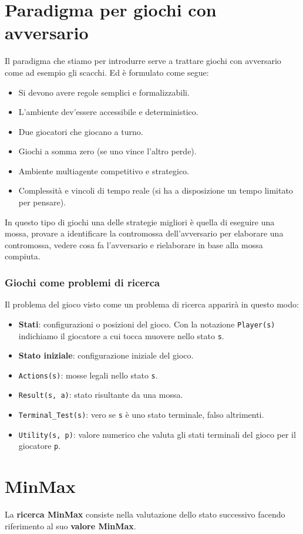 \section{Paradigma per giochi con avversario}
Il paradigma che stiamo per introdurre serve a trattare giochi con avversario come ad esempio gli scacchi. Ed \`e formulato
come segue:
\begin{itemize}
	\item Si devono avere regole semplici e formalizzabili.
	\item L'ambiente dev'essere accessibile e deterministico.
	\item Due giocatori che giocano a turno.
	\item Giochi a somma zero (se uno vince l'altro perde).
	\item Ambiente multiagente competitivo e strategico.
	\item Complessit\`a e vincoli di tempo reale (si ha a disposizione un tempo limitato per pensare).
\end{itemize}
In questo tipo di giochi una delle strategie migliori \`e quella di eseguire una mossa, provare a identificare la
contromossa dell'avversario per elaborare una contromossa, vedere cosa fa l'avversario e rielaborare in base alla
mossa compiuta.

\subsubsection{Giochi come problemi di ricerca}
Il problema del gioco visto come un problema di ricerca apparir\`a in questo modo:
\begin{itemize}
	\item \textbf{Stati}: configurazioni o posizioni del gioco. Con la notazione \verb|Player(s)| indichiamo il giocatore
	      a cui tocca muovere nello stato \verb|s|.
	\item \textbf{Stato iniziale}: configurazione iniziale del gioco.
	\item \verb|Actions(s)|: mosse legali nello stato \verb|s|.
	\item \verb|Result(s, a)|: stato risultante da una mossa.
	\item \verb|Terminal_Test(s)|: vero se \verb|s| \`e uno stato terminale, falso altrimenti.
	\item \verb|Utility(s, p)|: valore numerico che valuta gli stati terminali del gioco per il giocatore \verb|p|.
\end{itemize}

\section{MinMax}
La \textbf{ricerca MinMax} consiste nella valutazione dello stato successivo facendo riferimento al suo
\textbf{valore MinMax}.

